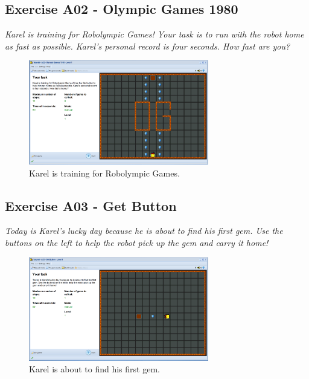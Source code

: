\documentclass[article,A4,12pt]{llncs}
\begin{document}
\subsection{Exercise A02 - Olympic Games 1980}

{\em Karel is training for Robolympic Games! Your task is to run with 
the robot home as fast as possible. Karel's personal record is four seconds. How fast are you?}

\begin{figure}[!ht]
\begin{center}
\includegraphics[width=0.7\textwidth]{img/a02.png}
\end{center}
\vspace{-4mm}
\caption{Karel is training for Robolympic Games.}
\label{fig:a02}
\vspace{-4mm}
\end{figure}
\noindent

\newpage
\subsection{Exercise A03 - Get Button}

{\em Today is Karel's lucky day because he is about to find his first gem. 
Use the buttons on the left to help the robot pick up the gem and carry it 
home!}

\begin{figure}[!ht]
\begin{center}
\includegraphics[width=0.7\textwidth]{img/a03.png}
\end{center}
\vspace{-4mm}
\caption{Karel is about to find his first gem.}
\label{fig:a03}
\end{figure}
\noindent
\end{document}
